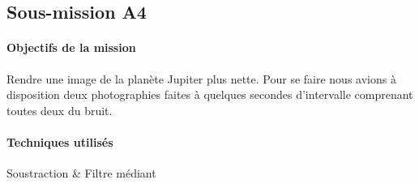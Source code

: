 	\subsection{Sous-mission A4}

	\begin{vwcol}[widths={0.65,0.2}, rule=0pt]
	\begin{minipage}{0.7\textwidth}
	\paragraph{Objectifs de la mission}

	Rendre une image de la planète Jupiter plus nette. Pour se faire nous avions à disposition deux photographies faites à quelques secondes d'intervalle comprenant toutes deux du bruit.
	\end{minipage}

	\begin{minipage}{0.3\textwidth}
	\begin{flushright}
	\paragraph{Techniques utilisés}

	Soustraction\up{\ref{Soustraction}} \& Filtre médiant\up{\ref{Mediant}}
	\end{flushright}
	\end{minipage}

	\end{vwcol} 

